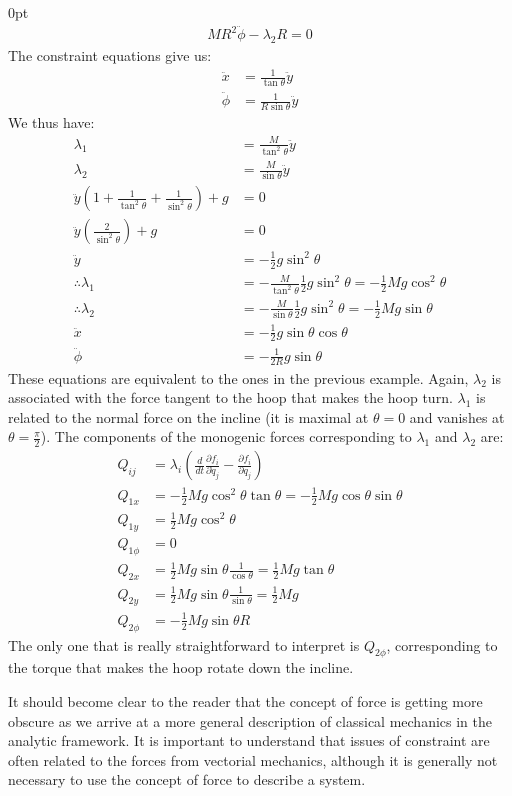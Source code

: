 \begin{example}{0pt}
\begin{align*}
MR^2\ddot{\phi}-\lambda_2 R=0
\end{align*}
The constraint equations give us:
\begin{align*}
\ddot{x}&=\frac{1}{\tan{\theta}}\ddot{y}\\
\ddot{\phi}&=\frac{1}{R\sin{\theta}}\ddot{y}
\end{align*}
We thus have:
\begin{align*}
\lambda_1&=\frac{M}{\tan^2{\theta}}\ddot{y}\\
\lambda_2&=\frac{M}{\sin{\theta}}\ddot{y}\\
\ddot{y}\left(1+\frac{1}{\tan^2{\theta}}+\frac{1}{\sin^2{\theta}}\right)+g&=0\\
\ddot{y}\left(\frac{2}{\sin^2{\theta}}\right)+g&=0\\
\ddot{y}&=-\frac{1}{2}g\sin^2{\theta}\\
\therefore \lambda_1&=-\frac{M}{\tan^2{\theta}}\frac{1}{2}g\sin^2{\theta}=-\frac{1}{2}Mg\cos^2{\theta}\\
\therefore \lambda_2&=-\frac{M}{\sin{\theta}}\frac{1}{2}g\sin^2{\theta}=-\frac{1}{2}Mg\sin{\theta}\\
\ddot{x}&=-\frac{1}{2}g\sin{\theta}\cos{\theta}\\
\ddot{\phi}&=-\frac{1}{2R}g\sin{\theta}
\end{align*}
These equations are equivalent to the ones in the previous example. Again, $\lambda_2$ is associated with the force tangent to the hoop that makes the hoop turn. $\lambda_1$ is related to the normal force on the incline (it is maximal at $\theta=0$ and vanishes at $\theta=\frac{\pi}{2}$). The components of the monogenic forces corresponding to $\lambda_1$ and $\lambda_2$ are:
\begin{align*}
Q_{ij}&=\lambda_i\left(\frac{d}{dt}\frac{\partial f_i}{\partial \dot{q}_j}-\frac{\partial f_i}{\partial q_j}\right)\\
Q_{1x}&=-\frac{1}{2}Mg\cos^2{\theta}\tan{\theta}=-\frac{1}{2}Mg\cos{\theta}\sin{\theta}\\
Q_{1y}&=\frac{1}{2}Mg\cos^2{\theta}\\
Q_{1\phi}&=0\\
Q_{2x}&=\frac{1}{2}Mg\sin{\theta}\frac{1}{\cos{\theta}}=\frac{1}{2}Mg\tan{\theta}\\
Q_{2y}&=\frac{1}{2}Mg\sin{\theta}\frac{1}{\sin{\theta}}=\frac{1}{2}Mg\\
Q_{2\phi}&=-\frac{1}{2}Mg\sin{\theta}R
\end{align*}
The only one that is really straightforward to interpret is $Q_{2\phi}$, corresponding to the torque that makes the hoop rotate down the incline.
\end{example}
It should become clear to the reader that the concept of force is getting more obscure as we arrive at a more general description of classical mechanics in the analytic framework. It is important to understand that issues of constraint are often related to the forces from vectorial mechanics, although it is generally not necessary to use the concept of force to describe a system.

